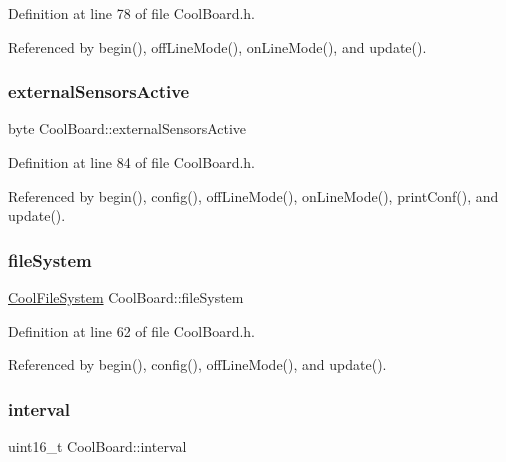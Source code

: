 Definition at line 78 of file Cool\+Board.\+h.



Referenced by begin(), off\+Line\+Mode(), on\+Line\+Mode(), and update().

\mbox{\label{classCoolBoard_af29860cc422622dc33614f9eabb58c40}} 
\subsubsection{\texorpdfstring{external\+Sensors\+Active}{externalSensorsActive}}
{\footnotesize\ttfamily byte Cool\+Board\+::external\+Sensors\+Active\hspace{0.3cm}{\ttfamily [private]}}



Definition at line 84 of file Cool\+Board.\+h.



Referenced by begin(), config(), off\+Line\+Mode(), on\+Line\+Mode(), print\+Conf(), and update().

\mbox{\label{classCoolBoard_a42c2586fbb13ff7f06538e9284e8538d}} 
\subsubsection{\texorpdfstring{file\+System}{fileSystem}}
{\footnotesize\ttfamily \hyperlink{classCoolFileSystem}{Cool\+File\+System} Cool\+Board\+::file\+System\hspace{0.3cm}{\ttfamily [private]}}



Definition at line 62 of file Cool\+Board.\+h.



Referenced by begin(), config(), off\+Line\+Mode(), and update().

\mbox{\label{classCoolBoard_a6d5c2603e162dcd6e7626a5b90f30837}} 
\subsubsection{\texorpdfstring{interval}{interval}}
{\footnotesize\ttfamily uint16\+\_\+t Cool\+Board\+::interval\hspace{0.3cm}{\ttfamily [private]}}



